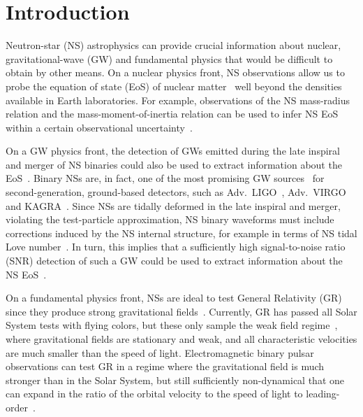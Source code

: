 \documentclass[aps,twocolumn,nofootinbib,showpacs,superscriptaddress,hyperref]{revtex4-1}
\begin{document}
\date{\today}
\maketitle
\tableofcontents

\section{Introduction}

Neutron-star (NS) astrophysics can provide crucial information about nuclear, gravitational-wave (GW) and fundamental physics that would be difficult to obtain by other means. On a nuclear physics front, NS observations allow us to probe the equation of state (EoS) of nuclear matter~\cite{lattimer-prakash-review} well beyond the densities available in Earth laboratories. For example, observations of the NS mass-radius relation and the mass-moment-of-inertia relation can be used to infer NS EoS within a certain observational uncertainty~\cite{steiner-lattimer-brown,ozel-baym-guver,ozel-review,guver,lattimer-schutz,kramer-wex}. 

On a GW physics front, the detection of GWs emitted during the late inspiral and merger of NS binaries could also be used to extract information about the EoS~\cite{hinderer-love,damour-nagar,binnington-poisson}. Binary NSs are, in fact, one of the most promising GW sources~\cite{thorne-source,schutz-source,abadie} for second-generation, ground-based detectors, such as Adv.~LIGO~\cite{ligo}, Adv.~VIRGO~\cite{virgo} and KAGRA~\cite{kagra}. Since NSs are tidally deformed in the late inspiral and merger, violating the test-particle approximation, NS binary waveforms must include corrections induced by the NS internal structure, for example in terms of NS tidal Love number~\cite{hinderer-love,damour-nagar,binnington-poisson}. In turn, this implies that a sufficiently high signal-to-noise ratio (SNR) detection of such a GW could be used to extract information about the NS EoS~\cite{flanagan-hinderer-love,read-love,hinderer-lackey-lang-read,kiuchi,kyutoku,hotokezaka,vines1,vines2,lackey,damour-nagar-villain,baiotti,pannarale,bernuzzi,hotokezaka2}.  

On a fundamental physics front, NSs are ideal to test General Relativity (GR) since they produce strong gravitational fields~\cite{stairs,psaltis-review,dedeo-psaltis}. Currently, GR has passed all Solar System tests with flying colors, but these only sample the weak field regime~\cite{TEGP,will-living}, where gravitational fields are stationary and weak, and all characteristic velocities are much smaller than the speed of light. Electromagnetic binary pulsar observations can test GR in a regime where the gravitational field is much stronger than in the Solar System, but still sufficiently non-dynamical that one can expand in the ratio of the orbital velocity to the speed of light to leading-order~\cite{stairs}. 
\end{document}
